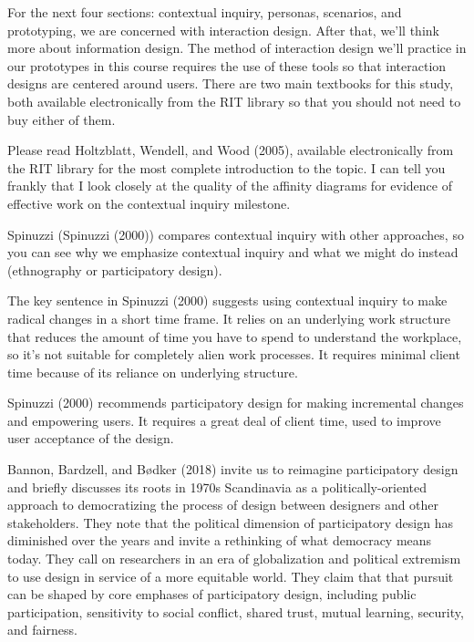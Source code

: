 \hypertarget{interaction-design}{%
\label{interaction-design}}

For the next four sections: contextual inquiry, personas, scenarios, and
prototyping, we are concerned with interaction design. After that, we'll
think more about information design. The method of interaction design
we'll practice in our prototypes in this course requires the use of
these tools so that interaction designs are centered around users. There
are two main textbooks for this study, both available electronically
from the RIT library so that you should not need to buy either of them.

\hypertarget{contextual-design}{%
\label{contextual-design}}

Please read Holtzblatt, Wendell, and Wood (2005), available
electronically from the RIT library for the most complete introduction
to the topic. I can tell you frankly that I look closely at the quality
of the affinity diagrams for evidence of effective work on the
contextual inquiry milestone.

\hypertarget{three-ways-to-study-users}{%
\label{three-ways-to-study-users}}

Spinuzzi (Spinuzzi (2000)) compares contextual inquiry with other
approaches, so you can see why we emphasize contextual inquiry and what
we might do instead (ethnography or participatory design).

\hypertarget{contextual-inquiry}{%
\label{contextual-inquiry}}

The key sentence in Spinuzzi (2000) suggests using contextual inquiry to
make radical changes in a short time frame. It relies on an underlying
work structure that reduces the amount of time you have to spend to
understand the workplace, so it's not suitable for completely alien work
processes. It requires minimal client time because of its reliance on
underlying structure.

\hypertarget{participatory-design}{%
\label{participatory-design}}

Spinuzzi (2000) recommends participatory design for making incremental
changes and empowering users. It requires a great deal of client time,
used to improve user acceptance of the design.

Bannon, Bardzell, and Bødker (2018) invite us to reimagine participatory
design and briefly discusses its roots in 1970s Scandinavia as a
politically-oriented approach to democratizing the process of design
between designers and other stakeholders. They note that the political
dimension of participatory design has diminished over the years and
invite a rethinking of what democracy means today. They call on
researchers in an era of globalization and political extremism to use
design in service of a more equitable world. They claim that that
pursuit can be shaped by core emphases of participatory design,
including public participation, sensitivity to social conflict, shared
trust, mutual learning, security, and fairness.

